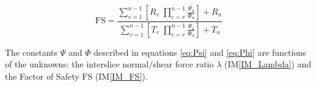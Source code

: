 \documentclass[12pt]{article}
\newcommand{\iref}[1]{IM\ref{#1}}
\begin{document}
\begin{equation}\label{eq:FS}
  \text{FS}= \frac{\displaystyle\sum_{v=1}^{n-1} \left[ {R_{v}}
      \;{\displaystyle\prod_{c=v}^{n-1} \frac{\Psi_{u}}{\Phi_{u}}
      }\right] + {R_{n}} }{\displaystyle\sum_{v=1}^{n-1} \left[
      {T_{v}} \;{\displaystyle\prod_{c=v}^{n-1}
        \frac{\Psi_{u}}{\Phi_{u}} }\right] + {T_{n}} }
\end{equation}

\noindent
The constants $\Psi$ and $\Phi$ described in equations \ref{eq:Psi}
and \ref{eq:Phi} are functions of the unknowns: the interslice
normal/shear force ratio $\lambda$ (\iref{IM_Lambda}) and the Factor
of Safety $\text{FS}$ (\iref{IM_FS}).

~\newline

\end{document}
